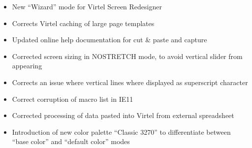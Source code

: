 \documentclass[letterpaper,10pt,english]{sphinxmanual}
\begin{document}
\begin{itemize}
\item {} 
New “Wizard” mode for Virtel Screen Redesigner

\end{itemize}

\begin{itemize}
\item {} 
Corrects Virtel caching of large page templates

\end{itemize}

\begin{itemize}
\item {} 
Updated online help documentation for cut \& paste and capture

\end{itemize}

\begin{itemize}
\item {} 
Corrected screen sizing in NOSTRETCH mode, to avoid vertical slider from appearing

\end{itemize}

\begin{itemize}
\item {} 
Corrects an issue where vertical lines where displayed as superscript character

\end{itemize}

\begin{itemize}
\item {} 
Correct corruption of macro list in IE11

\end{itemize}

\begin{itemize}
\item {} 
Corrected processing of data pasted into Virtel from external spreadsheet

\end{itemize}

\begin{itemize}
\item {} 
Introduction of new color palette “Classic 3270” to differentiate between “base color” and “default color” modes

\end{itemize}
\end{document}
